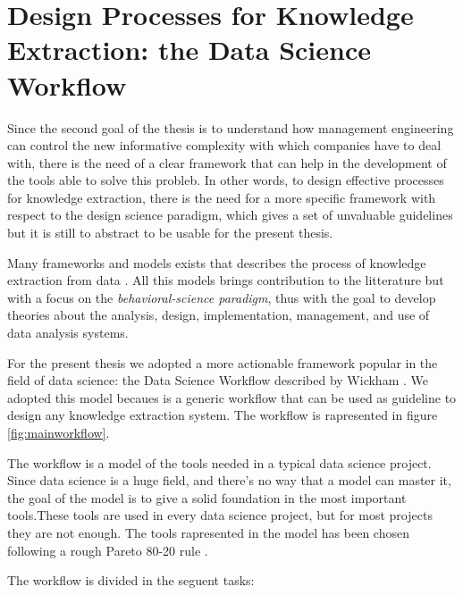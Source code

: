 \documentclass[]{book}
\begin{document}
\section{Design Processes for Knowledge Extraction: the Data Science
Workflow}\label{design-processes-for-knowledge-extraction-the-data-science-workflow}

Since the second goal of the thesis is to understand how management
engineering can control the new informative complexity with which
companies have to deal with, there is the need of a clear framework that
can help in the development of the tools able to solve this probleb. In
other words, to design effective processes for knowledge extraction,
there is the need for a more specific framework with respect to the
design science paradigm, which gives a set of unvaluable guidelines but
it is still to abstract to be usable for the present thesis.

Many frameworks and models exists that describes the process of
knowledge extraction from data \citep[\citet{bellinger2004data},
\citet{ackoff1989data},
\citet{liew2007understanding}]{kanehisa2013data}. All this models brings
contribution to the litterature but with a focus on the
\emph{behavioral-science paradigm}, thus with the goal to develop
theories about the analysis, design, implementation, management, and use
of data analysis systems.

For the present thesis we adopted a more actionable framework popular in
the field of data science: the Data Science Workflow described by
Wickham \citep{wickham2016r}. We adopted this model becaues is a generic
workflow that can be used as guideline to design any knowledge
extraction system. The workflow is rapresented in figure
\ref{fig:mainworkflow}.

The workflow is a model of the tools needed in a typical data science
project. Since data science is a huge field, and there's no way that a
model can master it, the goal of the model is to give a solid foundation
in the most important tools.These tools are used in every data science
project, but for most projects they are not enough. The tools
rapresented in the model has been chosen following a rough Pareto 80-20
rule \citep{pareto1971manual}.

The workflow is divided in the seguent tasks:
\end{document}
